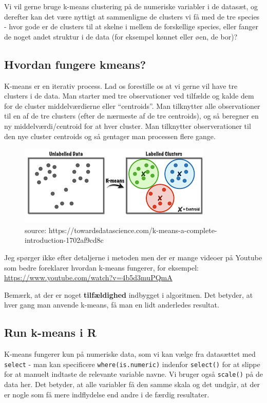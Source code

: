\documentclass[
]{book}
\begin{document}
Vi vil gerne bruge k-means clustering på de numeriske variabler i de datasæt, og derefter kan det være nyttigt at sammenligne de clusters vi få med de tre species - hvor gode er de clusters til at skelne i mellem de forskellige species, eller fanger de noget andet struktur i de data (for eksempel kønnet eller øen, de bor)?

\hypertarget{hvordan-fungere-kmeans}{%
\subsection{Hvordan fungere kmeans?}\label{hvordan-fungere-kmeans}}

K-means er en iterativ process. Lad os forestille os at vi gerne vil have tre clusters i de data. Man starter med tre observationer ved tilfælde og kalde dem for de cluster middelværdierne eller ``centroids''. Man tilknytter alle observationer til en af de tre clusters (efter de nærmeste af de tre centroids), og så beregner en ny middelværdi/centroid for at hver cluster. Man tilknytter observerationer til den nye cluster centroids og så gentager man processen flere gange.

\begin{figure}
\includegraphics[width=0.5\linewidth]{plots/kmeans} \caption{source: https://towardsdatascience.com/k-means-a-complete-introduction-1702af9cd8c}\label{fig:unnamed-chunk-422}
\end{figure}

Jeg spørger ikke efter detaljerne i metoden men der er mange videoer på Youtube som bedre foreklarer hvordan k-means fungerer, for eksempel: \url{https://www.youtube.com/watch?v=4b5d3muPQmA}

Bemærk, at der er noget \textbf{tilfældighed} indbygget i algoritmen. Det betyder, at hver gang man anvende k-means, få man en lidt anderledes resultat.

\hypertarget{run-k-means-i-r}{%
\subsection{Run k-means i R}\label{run-k-means-i-r}}

K-means fungerer kun på numeriske data, som vi kan vælge fra datasættet med \texttt{select} - man kan specificere \texttt{where(is.numeric)} indenfor \texttt{select()} for at slippe for at manuelt indtaste de relevante variable navne. Vi bruger også \texttt{scale()} på de data her. Det betyder, at alle variabler få den samme skala og det undgår, at der er nogle som få mere indflydelse end andre i de færdig resultater.
\end{document}
